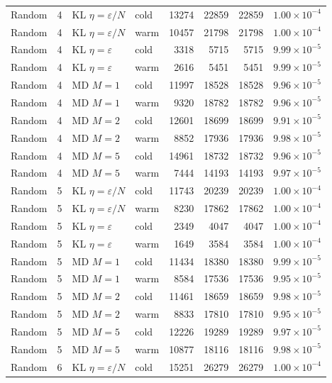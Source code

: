 \begin{table}[t]
\begin{tabular}{llllrrrr}
Random & 4 & KL $\eta=\varepsilon/N$ & cold & 13274 & 22859 & 22859 & $1.00\times 10^{-4}$ \\
Random & 4 & KL $\eta=\varepsilon/N$ & warm & 10457 & 21798 & 21798 & $1.00\times 10^{-4}$ \\
Random & 4 & KL $\eta=\varepsilon$ & cold & 3318 & 5715 & 5715 & $9.99\times 10^{-5}$ \\
Random & 4 & KL $\eta=\varepsilon$ & warm & 2616 & 5451 & 5451 & $9.99\times 10^{-5}$ \\
Random & 4 & MD $M=1$ & cold & 11997 & 18528 & 18528 & $9.96\times 10^{-5}$ \\
Random & 4 & MD $M=1$ & warm & 9320 & 18782 & 18782 & $9.96\times 10^{-5}$ \\
Random & 4 & MD $M=2$ & cold & 12601 & 18699 & 18699 & $9.91\times 10^{-5}$ \\
Random & 4 & MD $M=2$ & warm & 8852 & 17936 & 17936 & $9.98\times 10^{-5}$ \\
Random & 4 & MD $M=5$ & cold & 14961 & 18732 & 18732 & $9.96\times 10^{-5}$ \\
Random & 4 & MD $M=5$ & warm & 7444 & 14193 & 14193 & $9.97\times 10^{-5}$ \\
\midrule
Random & 5 & KL $\eta=\varepsilon/N$ & cold & 11743 & 20239 & 20239 & $1.00\times 10^{-4}$ \\
Random & 5 & KL $\eta=\varepsilon/N$ & warm & 8230 & 17862 & 17862 & $1.00\times 10^{-4}$ \\
Random & 5 & KL $\eta=\varepsilon$ & cold & 2349 & 4047 & 4047 & $1.00\times 10^{-4}$ \\
Random & 5 & KL $\eta=\varepsilon$ & warm & 1649 & 3584 & 3584 & $1.00\times 10^{-4}$ \\
Random & 5 & MD $M=1$ & cold & 11434 & 18380 & 18380 & $9.99\times 10^{-5}$ \\
Random & 5 & MD $M=1$ & warm & 8584 & 17536 & 17536 & $9.95\times 10^{-5}$ \\
Random & 5 & MD $M=2$ & cold & 11461 & 18659 & 18659 & $9.98\times 10^{-5}$ \\
Random & 5 & MD $M=2$ & warm & 8833 & 17810 & 17810 & $9.95\times 10^{-5}$ \\
Random & 5 & MD $M=5$ & cold & 12226 & 19289 & 19289 & $9.97\times 10^{-5}$ \\
Random & 5 & MD $M=5$ & warm & 10877 & 18116 & 18116 & $9.98\times 10^{-5}$ \\
\midrule
Random & 6 & KL $\eta=\varepsilon/N$ & cold & 15251 & 26279 & 26279 & $1.00\times 10^{-4}$ \\

\end{tabular}
\end{table}
